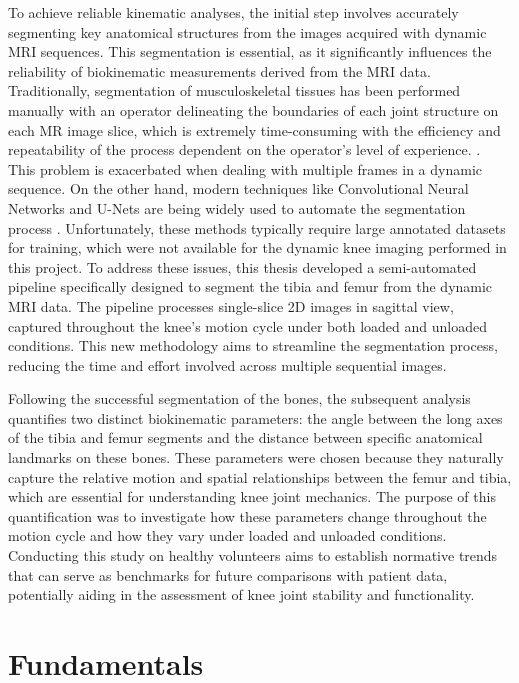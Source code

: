 \documentclass{micro-econ-thesis}
\begin{document}
To achieve reliable kinematic analyses, the initial step involves accurately segmenting key anatomical structures from the images acquired with dynamic MRI sequences. This segmentation is essential, as it significantly influences the reliability of biokinematic measurements derived from the MRI data. Traditionally, segmentation of musculoskeletal tissues has been performed manually with an operator delineating the boundaries of each joint structure on each MR image slice, which is extremely time-consuming with the efficiency and repeatability of the process dependent on the operator's level of experience. \parencite{mcwalter_use_2005}. This problem is exacerbated when dealing with multiple frames in a dynamic sequence. On the other hand, modern techniques like Convolutional Neural Networks and U-Nets are being widely used to automate the segmentation process \parencite{liu_deep_2018}. Unfortunately, these methods typically require large annotated datasets for training, which were not available for the dynamic knee imaging performed in this project. To address these issues, this thesis developed a semi-automated pipeline specifically designed to segment the tibia and femur from the dynamic MRI data. The pipeline processes single-slice 2D images in sagittal view, captured throughout the knee's motion cycle under both loaded and unloaded conditions. This new methodology aims to streamline the segmentation process, reducing the time and effort involved across multiple sequential images.

Following the successful segmentation of the bones, the subsequent analysis quantifies two distinct biokinematic parameters: the angle between the long axes of the tibia and femur segments and the distance between specific anatomical landmarks on these bones. These parameters were chosen because they naturally capture the relative motion and spatial relationships between the femur and tibia, which are essential for understanding knee joint mechanics. The purpose of this quantification was to investigate how these parameters change throughout the motion cycle and how they vary under loaded and unloaded conditions. Conducting this study on healthy volunteers aims to establish normative trends that can serve as benchmarks for future comparisons with patient data, potentially aiding in the assessment of knee joint stability and functionality. 

\section{Fundamentals}
\label{sec:intro}
\end{document}
